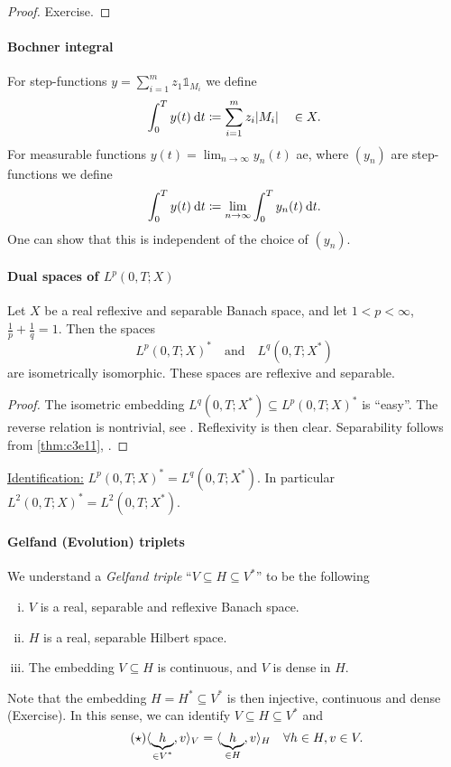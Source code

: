 \documentclass[../skript.tex]{subfiles}
\begin{document}
\begin{proof}
Exercise.
\end{proof}
\paragraph{Bochner integral}
For step-functions $y = \sum_{i=1}^m z_1 \mathds{1}_{M_i}$ we define
\[
	\int_0^T y(t) \:\mathrm{d}t \coloneqq \sum_{i=1}^m z_i |M_i| \quad \in X.
\]
For measurable functions $y(t) = \lim_{n \to \infty} y_n(t)$ \ac{ae}, where $(y_n)$ are step-functions we define
\[
	\int_0^T y(t) \:\mathrm{d}t \coloneqq \lim_{n \to \infty} \int_0^T y_n(t) \:\mathrm{d}t.
\]
One can show that this is independent of the choice of $(y_n)$.
\paragraph{Dual spaces of \texorpdfstring{$L^p(0, T; X)$}{Lp(0, T; X)}}
\begin{proposition} %
\label{thm:c3e12}
Let $X$ be a real reflexive and separable Banach space, and let $1 < p < \infty$, $\frac{1}{p} + \frac{1}{q} = 1$. Then the spaces
\[
	L^p(0, T; X)^* \quad \text{and} \quad L^q(0, T; X^*)
\]
are isometrically isomorphic. These spaces are reflexive and separable.
\end{proposition}
\begin{proof}
The isometric embedding $L^q(0, T; X^*) \subseteq L^p(0, T; X)^*$ is ``easy''. The reverse relation is nontrivial, see \cite[8.20.5]{Edwards}. %
Reflexivity is then clear. Separability follows from \cref{thm:c3e11}, .
\end{proof}
\underline{Identification:} $L^p(0, T; X)^* = L^q(0, T; X^*)$.
In particular $L^2(0, T; X)^* = L^2(0, T; X^*)$.
\paragraph{Gelfand (Evolution) triplets}
\begin{definition} %
\label{def:c3e13}
We understand a \emph{Gelfand triple} ``$V \subseteq H \subseteq V^*$'' to be the following
\begin{enumerate}[(i)]
\item $V$ is a real, separable and reflexive Banach space.
\item $H$ is a real, separable Hilbert space.
\item The embedding $V \subseteq H$ is continuous, and $V$ is dense in $H$.
\end{enumerate}
\end{definition}
Note that the embedding $H = H^* \subseteq V^*$ is then injective, continuous and dense (Exercise). In this sense, we can identify $V \subseteq H \subseteq V^*$ and
\begin{equation}
\tag{$\star$}
\label{eq:c3e2-star}
\langle \underbrace{h}_{\mathclap{\in V^*}}, v \rangle_V = \langle \underbrace{h}_{\mathclap{\in H}}, v \rangle_H \quad \forall h \in H, v \in V.
\end{equation}
\end{document}
